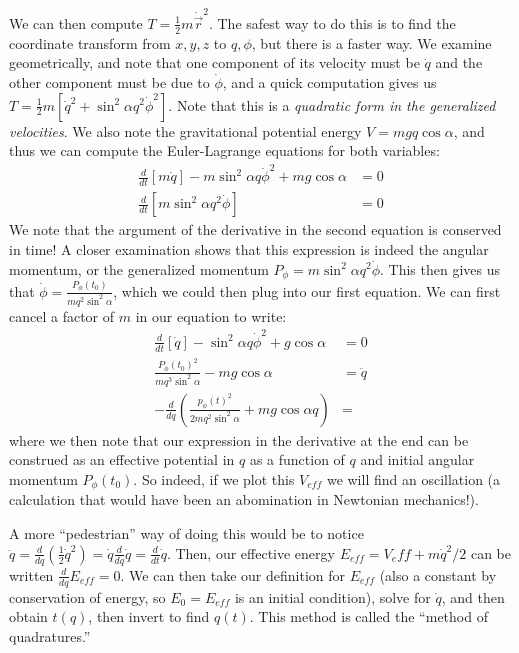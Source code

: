 \documentclass[10pt]{report}
\newcommand{\rd}[2]{\frac{d#1}{d#2}}
\begin{document}
We can then compute $T=\frac{1}{2}m\dot{\vec{r}}^2$. The safest way to do this is to find the coordinate transform from $x,y,z$ to $q,\phi$, but there is a faster way. We examine geometrically, and note that one component of its velocity must be $\dot{q}$ and the other component must be due to $\dot{\phi}$, and a quick computation gives us $T=\frac{1}{2}m\left[ \dot{q}^2+\sin^2\alpha q^2 \dot{\phi}^2 \right]$. Note that this is a \emph{quadratic form in the generalized velocities}. We also note the gravitational potential energy $V=mgq\cos\alpha$, and thus we can compute the Euler-Lagrange equations for both variables:
\begin{align*}
    \rd{}{t}\left[ m\dot{q} \right] - m\sin^2\alpha q\dot{\phi}^2 + mg\cos\alpha &= 0\\
    \rd{}{t}\left[ m\sin^2\alpha q^2\dot{\phi} \right] &= 0
\end{align*}
We note that the argument of the derivative in the second equation is conserved in time! A closer examination shows that this expression is indeed the angular momentum, or the generalized momentum $P_\phi=m\sin^2\alpha q^2 \dot{\phi}$. This then gives us that $\dot{\phi}=\frac{P_\phi(t_0)}{mq^2\sin^2\alpha}$, which we could then plug into our first equation. We can first cancel a factor of $m$ in our equation to write:
\begin{align*}
    \rd{}{t}\left[\dot{q} \right] - \sin^2\alpha q\dot{\phi}^2 + g\cos\alpha &= 0\\
    \frac{P_\phi(t_0)^2}{mq^3\sin^2\alpha} - mg\cos\alpha &= \ddot{q}\\
    -\rd{}{q}\left( \frac{p_\phi(t)^2}{2mq^2\sin^2\alpha} + mg\cos\alpha q \right) &=
\end{align*}
where we then note that our expression in the derivative at the end can be construed as an effective potential in $q$ as a function of $q$ and initial angular momentum $P_\phi(t_0)$. So indeed, if we plot this $V_{eff}$ we will find an oscillation (a calculation that would have been an abomination in Newtonian mechanics!). 

A more ``pedestrian'' way of doing this would be to notice $\ddot{q}=\rd{}{q}\left( \frac{1}{2}\dot{q}^2 \right) = \dot{q}\rd{}{q}\dot{q} = \rd{}{t}\dot{q}$. Then, our effective energy $E_{eff}=V_eff+m\dot{q}^2/2$ can be written $\rd{}{q}E_{eff}=0$. We can then take our definition for $E_{eff}$ (also a constant by conservation of energy, so $E_0=E_{eff}$ is an initial condition), solve for $\dot{q}$, and then obtain $t(q)$, then invert to find $q(t)$. This method is called the ``method of quadratures.''
\end{document}
